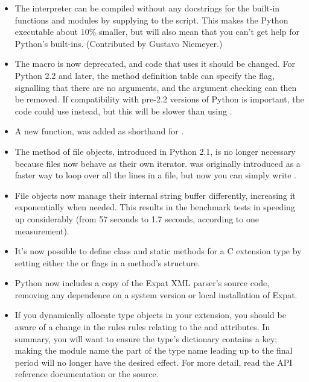 \documentclass{howto}
\begin{document}
\begin{itemize}
\item The interpreter can be compiled without any docstrings for
the built-in functions and modules by supplying
 to the  script.
This makes the Python executable about 10\% smaller, but will also
mean that you can't get help for Python's built-ins.  (Contributed by
Gustavo Niemeyer.)

\item The  macro is now deprecated, and code
that uses it should be changed.  For Python 2.2 and later, the method
definition table can specify the
 flag, signalling that there are no arguments, and
the argument checking can then be removed.  If compatibility with
pre-2.2 versions of Python is important, the code could use
 instead, but this will be slower
than using .

\item A new function,  was added
as shorthand for
.

\item The  method of file objects, introduced in
Python 2.1, is no longer necessary because files now behave as their
own iterator.   was originally introduced as a
faster way to loop over all the lines in a file, but now you can
simply write .

\item File objects now manage their internal string buffer
differently, increasing it exponentially when needed.  This results in
the benchmark tests in  speeding up
considerably (from 57 seconds to 1.7 seconds, according to one
measurement).

\item It's now possible to define class and static methods for a C
extension type by setting either the  or
 flags in a method's 
structure.

\item Python now includes a copy of the Expat XML parser's source code,
removing any dependence on a system version or local installation of
Expat.

\item If you dynamically allocate type objects in your extension, you
should be aware of a change in the rules rules relating to the
 and  attributes.  In summary,
you will want to ensure the type's dictionary contains a
 key; making the module name the part of the type
name leading up to the final period will no longer have the desired
effect.  For more detail, read the API reference documentation or the 
source.

\end{itemize}
\end{document}

